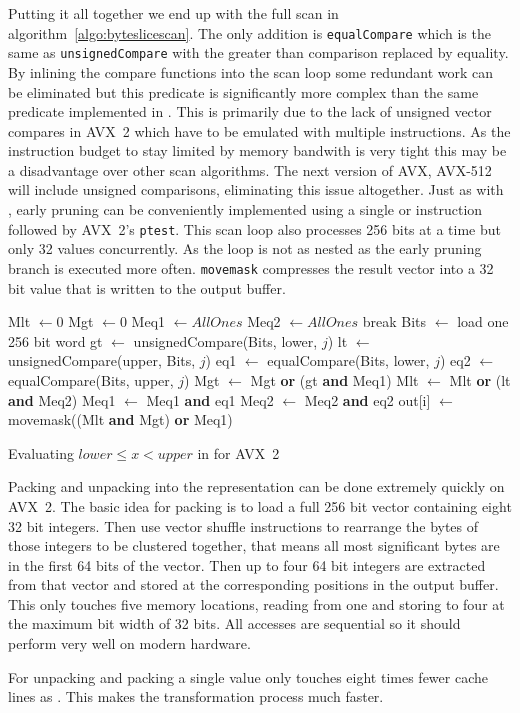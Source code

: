 Putting it all together we end up with the full scan in
algorithm~\ref{algo:byteslicescan}. The only addition is \texttt{equalCompare}
which is the same as \texttt{unsignedCompare} with the greater than comparison
replaced by equality. By inlining the compare functions into the scan loop some
redundant work can be eliminated but this predicate is significantly more
complex than the same predicate implemented in \bwv{}. This is primarily due to
the lack of unsigned vector compares in AVX~2 which have to be emulated with
multiple instructions. As the instruction budget to stay limited by memory
bandwith is very tight this may be a disadvantage over other scan algorithms.
The next version of AVX, AVX-512 will include unsigned comparisons, eliminating
this issue altogether. Just as with \bwv{}, early pruning can be conveniently
implemented using a single or instruction followed by AVX~2's \texttt{ptest}.
This scan loop also processes 256 bits at a time but only 32 values
concurrently. As the loop is not as nested as \bwv{} the early pruning branch is
executed more often. \texttt{movemask} compresses the result vector into a 32
bit value that is written to the output buffer.

\begin{algorithm}[h]
\begin{algorithmic}[1]
    \State Mlt $\gets 0$
    \State Mgt $\gets 0$
    \State Meq1 $\gets AllOnes$
    \State Meq2 $\gets AllOnes$
        \State break 
      \EndIf
      \State Bits $\gets$ load one 256 bit word
      \State gt $\gets$ unsignedCompare(Bits, lower, $j$)
      \State lt $\gets$ unsignedCompare(upper, Bits, $j$)
      \State eq1 $\gets$ equalCompare(Bits, lower, $j$)
      \State eq2 $\gets$ equalCompare(Bits, upper, $j$)
      \State Mgt $\gets$ Mgt \textbf{or} (gt \textbf{and} Meq1)
      \State Mlt $\gets$ Mlt \textbf{or} (lt \textbf{and} Meq2)
      \State Meq1 $\gets$ Meq1 \textbf{and} eq1
      \State Meq2 $\gets$ Meq2 \textbf{and} eq2
    \EndFor
    \State out[i] $\gets$ movemask((Mlt \textbf{and} Mgt) \textbf{or} Meq1)
  \EndFor
  \EndProcedure
\end{algorithmic}
\caption{Evaluating $lower \le x < upper$ in \bs{} for AVX~2}
\label{algo:byteslicescan}
\end{algorithm}

Packing and unpacking into the \bs{} representation can be done extremely
quickly on AVX~2. The basic idea for packing is to load a full 256 bit vector
containing eight 32 bit integers. Then use vector shuffle instructions to
rearrange the bytes of those integers to be clustered together, that means all
most significant bytes are in the first 64 bits of the vector. Then up to four
64 bit integers are extracted from that vector and stored at the corresponding
positions in the output buffer. This only touches five memory locations, reading
from one and storing to four at the maximum bit width of 32 bits. All accesses
are sequential so it should perform very well on modern hardware.

For \bs{} unpacking and packing a single value only touches eight times fewer
cache lines as \bwv{}. This makes the transformation process much faster.
